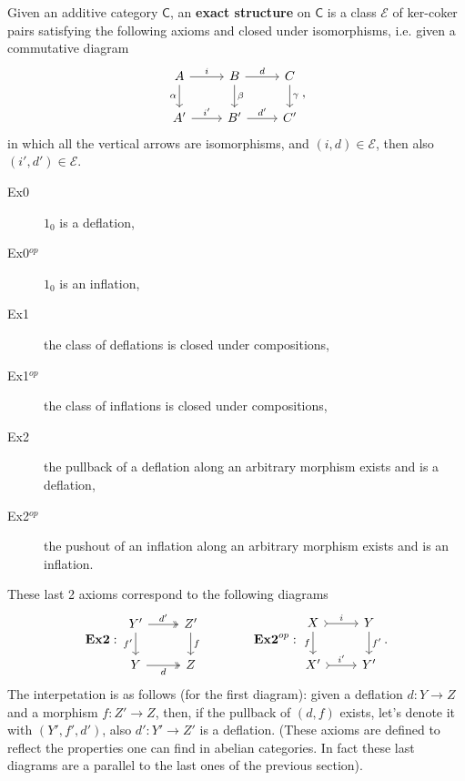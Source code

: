 \begin{defn}
	Given an additive category $\mathsf{C}$, an \textbf{exact structure} on $\mathsf{C}$
	is a class $\mathcal{E}$ of ker-coker pairs satisfying the following axioms and closed under isomorphisms, i.e.
	given a commutative diagram
	\begin{equation}
	\begin{tikzcd}
		A \arrow[r, "i", rightarrow] \arrow[d, "\alpha"', rightarrow] &
		B \arrow[r, "d", rightarrow] \arrow[d, "\beta", rightarrow] &
		C \arrow[d, "\gamma", rightarrow] \\
		A' \arrow[r, "i'", rightarrow] &
		B' \arrow[r, "d'", rightarrow] &
		C'
	\end{tikzcd}
	,\end{equation} 
	in which all the vertical arrows are isomorphisms, and $\left(i, d\right) \in \mathcal{E}$, then also $\left(i', d'\right) \in \mathcal{E}$.
	\begin{description}
		\item[Ex0] $1_0$ is a deflation,
		\item[Ex0$^{op}$] $1_0$ is an inflation,
		\item[Ex1] the class of deflations is closed under compositions,
		\item[Ex1$^{op}$] the class of inflations is closed under compositions,
		\item[Ex2] the pullback of a deflation along an arbitrary morphism exists and is a deflation,
		\item[Ex2$^{op}$] the pushout of an inflation along an arbitrary morphism exists and is an inflation.
	\end{description} 
	These last 2 axioms correspond to the following diagrams
	\begin{equation}
	\mathbf{Ex2}:
	\begin{tikzcd}
		Y' \arrow[r, "d'", twoheadrightarrow] \arrow[d, "f'"', rightarrow] &
		Z' \arrow[d, "f", rightarrow] \\
		Y \arrow[r, "d"', twoheadrightarrow] &
		Z
	\end{tikzcd}\quad\quad\quad\quad
	\mathbf{Ex2}^{op}:
	\begin{tikzcd}
		X \arrow[r, "i", tail] \arrow[d, "f"', rightarrow] &
		Y \arrow[d, "f'", rightarrow] \\
		X' \arrow[r, "i'", tail] &
		Y'
	\end{tikzcd}
	.\end{equation} 
	The interpetation is as follows (for the first diagram):
	given a deflation $d: Y \to Z$ and a morphism $f: Z' \to Z$, then,
	if the pullback of $\left(d, f\right)$ exists, let's denote it with $\left(Y', f', d'\right)$, also $d': Y' \to Z'$ is a deflation.
	(These axioms are defined to reflect the properties one can find
	in abelian categories.
	In fact these last diagrams are a parallel to the last ones of the previous section).
\end{defn}

